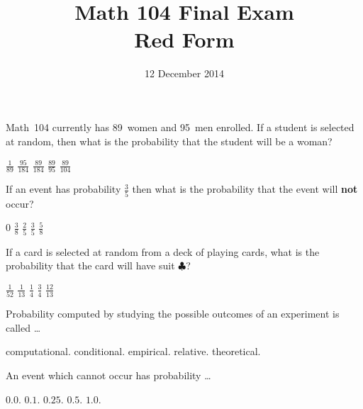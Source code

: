 \documentclass[answers,12pt]{exam}
\title{Math 104 Final Exam\\Red Form}
\date{12 December 2014}
\begin{document}
\maketitle
\begin{center}
\end{center}

\begin{questions}
\question Math~104 currently has 89~women and 95~men enrolled.
If a student is selected at random, then what is the probability
that the student will be a woman?\\
\begin{oneparchoices}
\choice $\frac{1}{89}$
\choice $\frac{95}{184}$
\correctchoice\choice $\frac{89}{184}$
\choice $\frac{89}{95}$
\choice $\frac{89}{104}$
\end{oneparchoices}

\question If an event has probability $\frac{3}{5}$
then what is the probability that the event will {\bf not} occur?\\
\begin{oneparchoices}
\choice $0$
\choice $\frac{3}{8}$
\correctchoice $\frac{2}{5}$
\choice $\frac{3}{5}$
\choice $\frac{5}{8}$
\end{oneparchoices}

\question If a card is selected at random from a deck of
playing cards, what is the probability that
the card will have suit $\clubsuit$?\\
\begin{oneparchoices}
\choice $\frac{1}{52}$
\choice $\frac{1}{13}$
\correctchoice $\frac{1}{4}$
\choice $\frac{3}{4}$
\choice $\frac{12}{13}$
\end{oneparchoices}

\question Probability computed by studying
the possible outcomes of an experiment is called \dots\\
\begin{oneparchoices}
\choice computational.
\choice conditional.
\choice empirical.
\choice relative.
\choice theoretical.
\end{oneparchoices}

\question An event which cannot occur has probability \dots\\
\begin{oneparchoices}
\choice $0.0$.
\choice $0.1$.
\choice $0.25$.
\choice $0.5$.
\choice $1.0$.
\end{oneparchoices}


\end{questions}
\end{document}
